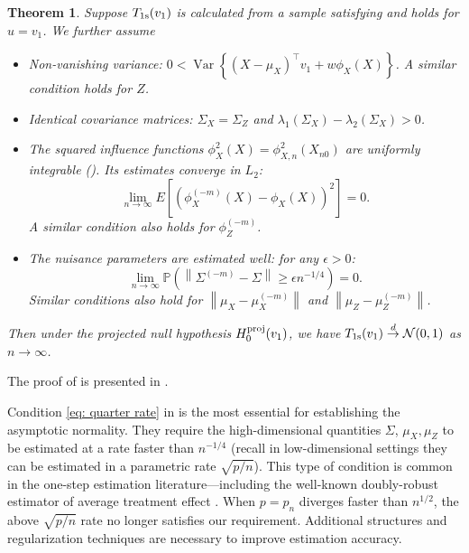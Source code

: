 \documentclass[11pt]{article}
\newtheorem{theorem}{Theorem}[section]
\begin{document}
\begin{theorem}
\label{th: one step}
    Suppose $T_{\rm 1s}(v_1)$ is calculated from a sample satisfying  and  holds for $u = v_1$. We further assume 
    \begin{itemize}
         \item Non-vanishing variance: $0 < \operatorname{Var}\left\{\left(X-\mu_X\right)^{\top} v_1+w \phi_X(X)\right\}$. A similar condition holds for $Z$.
          \item Identical covariance matrices: $\Sigma_X = \Sigma_Z$ and $\lambda_1(\Sigma_X) - \lambda_2(\Sigma_X) > 0$.
          \item The squared influence functions $\phi_X^2(X) = \phi^2_{X,n}(X_{n0})$ are uniformly integrable (). 
          Its estimates converge in $L_2$: \begin{equation}\label{eq: nuisance moment convergence}\lim_{n\rightarrow\infty} E[(\phi^{(-m)}_X(X) - \phi_X(X))^2] = 0.
          \end{equation}
          A similar condition also holds for $\phi^{(-m)}_Z$. 
         \item The nuisance parameters are estimated well: for any $\epsilon > 0$:
         \begin{equation}\label{eq: quarter rate} \lim_{n\rightarrow\infty}\mathbb{P}\left(\left\|\Sigma^{(-m)}-\Sigma\right\| \geq \epsilon n^{-1 / 4}\right) = 0.
         \end{equation}
         Similar conditions also hold for $\left\|\mu_X-\mu_X^{(-m)}\right\| $ and $\left\|\mu_Z-\mu_Z^{(-m)}\right\|$.
    \end{itemize}
Then under the projected null hypothesis $H_0^{\rm proj}(v_1)$, we have $T_{\rm 1s}(v_1) \stackrel{d}{\rightarrow} \mathcal{N}(0,1)$ as $n\rightarrow\infty$. 
\end{theorem}

The proof of 
is presented in .

Condition \eqref{eq: quarter rate} in  is the most essential for establishing the asymptotic normality. They require the high-dimensional quantities $\Sigma$, $\mu_X,\mu_Z$ to be estimated at a rate faster than $n^{-1/4}$ (recall in low-dimensional settings they can be estimated in a parametric rate $\sqrt{p/n}$). This type of condition is common in the one-step estimation literature---including the well-known doubly-robust estimator of average treatment effect \citep{glynn2010introduction}. When $p = p_n$ diverges faster than $n^{1/2}$, the above $\sqrt{p/n}$ rate no longer satisfies our requirement. Additional structures and regularization techniques are necessary to improve estimation accuracy.
\end{document}
